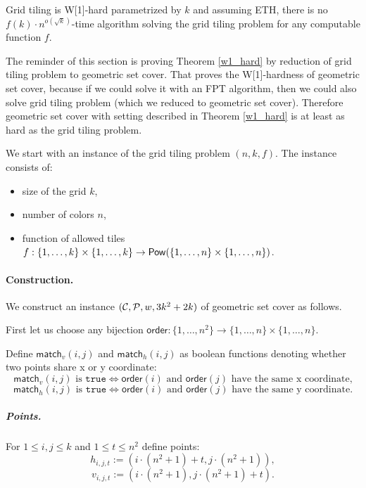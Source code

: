 \begin{tw}
\label{grid_tiling_w1_hard}
\textbf{\cite{marx_grid_tiling}}
Grid tiling is W[1]-hard parametrized by $k$ and
assuming ETH, there is no $f(k)\cdot n^{o(\sqrt{k})}$-time
algorithm solving the grid tiling problem
for any computable function $f$.
\end{tw}

The reminder of this section is proving Theorem \ref{w1_hard}
by reduction of grid tiling problem to geometric set cover.
That proves the W[1]-hardness of geometric set cover,
because if we could solve it with an FPT algorithm,
then we could also solve grid tiling problem
(which we reduced to geometric set cover).
Therefore geometric set cover with setting
described in Theorem \ref{w1_hard}
is at least as hard as the grid tiling problem.

We start with an instance of the grid tiling problem $(n, k, f)$.
The instance consists of:
\begin{itemize}
\item size of the grid $k$,
\item number of colors $n$,
\item function of allowed tiles
$f : \{1, \ldots, k\} \times \{1, \ldots, k\} \rightarrow \mathsf{Pow}(\{1, \ldots, n\} \times \{1, \ldots, n\})$.
\end{itemize}

\paragraph{Construction.}
\newcommand{\order}{\mathsf{order}}
\newcommand{\matchv}{\mathsf{match}_v}
\newcommand{\matchh}{\mathsf{match}_h}
\newcommand{\instanceSetCover}{(\points, \sets, w, 3k^2+2k)}
We construct an instance $\instanceSetCover$ of geometric set cover as follows.

First let us choose any bijection
$\order : \{1, \ldots, n^2\} \rightarrow \{1, \ldots, n\} \times \{1, \ldots, n\}$.


Define $\matchv(i, j)$ and $\matchh(i, j)$
as boolean functions denoting whether two points share x or y coordinate:
$$\matchv(i, j) \text{ is } \texttt{true} \iff
\order(i) \text{ and } \order(j) \text{ have the same x coordinate,}$$
$$\matchh(i, j) \text{ is } \texttt{true} \iff
\order(i) \text{ and } \order(j) \text{ have the same y coordinate.}$$


\subparagraph{Points.}

For $1 \le i,j \le k$ and $1 \le t \le n^2$ define points:
	$$h_{i, j, t} := (i \cdot (n^2+1) + t, j \cdot (n^2+1)),$$
	$$v_{i, j, t} := (i \cdot (n^2+1), j \cdot (n^2+1) + t).$$
	
